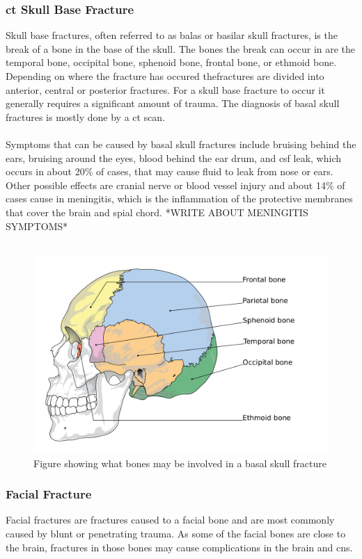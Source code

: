 \documentclass[11pt]{article}
\begin{document}
\subsubsection{\gls{ct} Skull Base Fracture}
Skull base fractures, often referred to as balas or basilar skull fractures, is the break of a bone in the base of the skull. The bones the break can occur in are the temporal bone, occipital bone, sphenoid bone, frontal bone, or ethmoid bone. Depending on where the fracture has occured thefractures are divided into anterior, central or posterior fractures. For a skull base fracture to occur it generally requires a significant amount of trauma. The diagnosis of basal skull fractures is mostly done by a \gls{ct} scan.\cite{BasilarSkullFracture2021}\\
\\
Symptoms that can be caused by basal skull fractures include bruising behind the ears, bruising around the eyes, blood behind the ear drum, and \gls{csf} leak, which occurs in about 20\% of cases, that may cause fluid to leak from nose or ears. Other possible effects are cranial nerve or blood vessel injury and about 14\% of cases cause in meningitis, which is the inflammation of the protective membranes that cover the brain and spial chord.\cite{BasilarSkullFracture2021} *WRITE ABOUT MENINGITIS SYMPTOMS*\\
\\
\begin{figure}[ht]
  \centering
  \includegraphics[width=12cm]{graphics/cranial_bones.pdf}
  \caption{Figure showing what bones may be involved in a basal skull fracture}
\end{figure}

\subsubsection{Facial Fracture}
Facial fractures are fractures caused to a facial bone and are most commonly caused by blunt or penetrating trauma\cite{ibrahimFacialFracturesRadiology}. As some of the facial bones are close to the brain, fractures in those bones may cause complications in the brain and \gls{cns}.\cite{FacialFracturesTypes}
\end{document}
